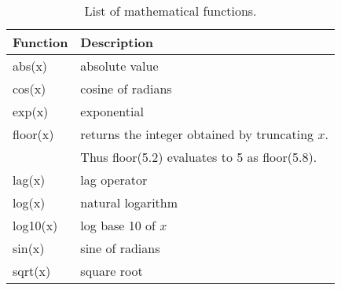 \begin{table}[ht]
\begin{center}
\begin{tabular}{|l|l|}
\hline
{\bf Function} & {\bf Description} \\
\hline \hline
abs(x) & absolute value \\
cos(x) & cosine of radians \\
exp(x) & exponential \\
floor(x) & returns the integer obtained by truncating $x$. \\
& Thus floor(5.2) evaluates to 5 as floor(5.8). \\
lag(x) & lag operator \\
log(x) & natural logarithm \\
log10(x) & log base 10 of $x$ \\
sin(x) & sine of radians \\
sqrt(x) & square root \\
\hline
\end{tabular}
{\em\caption{\label{mathfunc} List of mathematical functions.}}
\end{center}
\end{table}



